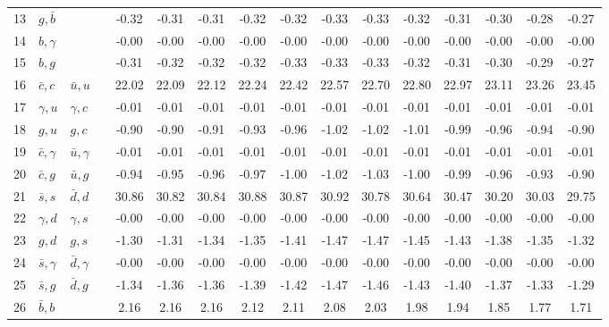 \begin{tabularx}{\textwidth}{rXXX@{}S@{}S@{}S@{}S@{}S@{}S@{}S@{}S@{}S@{}S@{}S@{}S}
 13 & $g,\bar b$       &                  &                 & -0.32 & -0.31 & -0.31 & -0.32 & -0.32 & -0.33 & -0.33 & -0.32 & -0.31 & -0.30 & -0.28 & -0.27 \\
 14 & $b,\gamma$       &                  &                 & -0.00 & -0.00 & -0.00 & -0.00 & -0.00 & -0.00 & -0.00 & -0.00 & -0.00 & -0.00 & -0.00 & -0.00 \\
 15 & $b,g$            &                  &                 & -0.31 & -0.32 & -0.32 & -0.32 & -0.33 & -0.33 & -0.33 & -0.32 & -0.31 & -0.30 & -0.29 & -0.27 \\
 16 & $\bar c,c$       & $\bar u,u$       &                 & 22.02 & 22.09 & 22.12 & 22.24 & 22.42 & 22.57 & 22.70 & 22.80 & 22.97 & 23.11 & 23.26 & 23.45 \\
 17 & $\gamma, u$      & $\gamma, c$      &                 & -0.01 & -0.01 & -0.01 & -0.01 & -0.01 & -0.01 & -0.01 & -0.01 & -0.01 & -0.01 & -0.01 & -0.01 \\
 18 & $g,u$            & $g,c$            &                 & -0.90 & -0.90 & -0.91 & -0.93 & -0.96 & -1.02 & -1.02 & -1.01 & -0.99 & -0.96 & -0.94 & -0.90 \\
 19 & $\bar c,\gamma$  & $\bar u,\gamma$  &                 & -0.01 & -0.01 & -0.01 & -0.01 & -0.01 & -0.01 & -0.01 & -0.01 & -0.01 & -0.01 & -0.01 & -0.01 \\
 20 & $\bar c, g$      & $\bar u, g$      &                 & -0.94 & -0.95 & -0.96 & -0.97 & -1.00 & -1.02 & -1.03 & -1.00 & -0.99 & -0.96 & -0.93 & -0.90 \\
 21 & $\bar s, s$      & $\bar d, d$      &                 & 30.86 & 30.82 & 30.84 & 30.88 & 30.87 & 30.92 & 30.78 & 30.64 & 30.47 & 30.20 & 30.03 & 29.75 \\
 22 & $\gamma, d$      & $\gamma, s$      &                 & -0.00 & -0.00 & -0.00 & -0.00 & -0.00 & -0.00 & -0.00 & -0.00 & -0.00 & -0.00 & -0.00 & -0.00 \\
 23 & $g,d$            & $g,s$            &                 & -1.30 & -1.31 & -1.34 & -1.35 & -1.41 & -1.47 & -1.47 & -1.45 & -1.43 & -1.38 & -1.35 & -1.32 \\
 24 & $\bar s,\gamma$  & $\bar d,\gamma$  &                 & -0.00 & -0.00 & -0.00 & -0.00 & -0.00 & -0.00 & -0.00 & -0.00 & -0.00 & -0.00 & -0.00 & -0.00 \\
 25 & $\bar s,g$       & $\bar d, g$      &                 & -1.34 & -1.36 & -1.36 & -1.39 & -1.42 & -1.47 & -1.46 & -1.43 & -1.40 & -1.37 & -1.33 & -1.29 \\
 26 & $\bar b,b$       &                  &                 &  2.16 &  2.16 &  2.16 &  2.12 &  2.11 &  2.08 &  2.03 &  1.98 &  1.94 &  1.85 &  1.77 &  1.71 \\

\end{tabularx}
